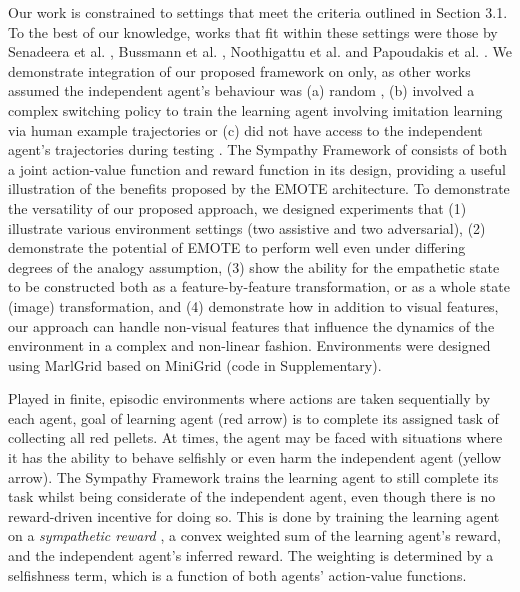 Our work is constrained to settings that meet the criteria outlined in Section 3.1. To the best of our knowledge, works that fit within these settings were those by Senadeera et al. \cite{SympathyPaper}, Bussmann et al. \cite{TowardsEmpathicDQN}, Noothigattu et al. \cite{Noothigattu2019} and Papoudakis et al. \cite{papoudakis2021agent}. 
We demonstrate integration of our proposed framework on \cite{SympathyPaper} only,
as other works assumed the independent agent’s behaviour was (a) random \cite{TowardsEmpathicDQN}, (b) involved a complex switching policy to train the learning agent involving imitation learning via human example trajectories \cite{Noothigattu2019} or (c) did not have access to the independent agent’s trajectories during testing \cite{papoudakis2021agent}. The Sympathy Framework of \cite{SympathyPaper} consists of both a joint action-value function and reward function in its design, providing a useful illustration of the benefits proposed by the EMOTE architecture. To demonstrate the versatility of our proposed approach, we designed experiments that (1) illustrate various environment settings (two assistive and two adversarial), (2) demonstrate the potential of EMOTE to perform well even under differing degrees of the analogy assumption, (3) show the ability for the empathetic state to be constructed both as a feature-by-feature transformation, or as a whole state (image) transformation, and (4) demonstrate how in addition to visual features, our approach can handle non-visual features that influence the dynamics of the environment in a complex and non-linear fashion. %
Environments were designed using MarlGrid \cite{MarlGrid} based on MiniGrid \cite{gym_minigrid} (code in Supplementary).


Played in finite, episodic environments where actions are taken sequentially by each agent, goal of learning agent (red arrow) is to complete its assigned task of collecting all red pellets. At times, the agent may be faced with situations where it has the ability to behave selfishly or even harm the independent agent (yellow arrow). The Sympathy Framework trains the learning agent to still complete its task whilst being considerate of the independent agent, even though there is no reward-driven incentive for doing so. This is done by training the learning agent on a \emph{sympathetic reward} \cite{SympathyPaper}, a convex weighted sum of the learning agent's reward, and the independent agent's inferred reward. The weighting is determined by a selfishness term, which is a function of both agents' action-value functions.

